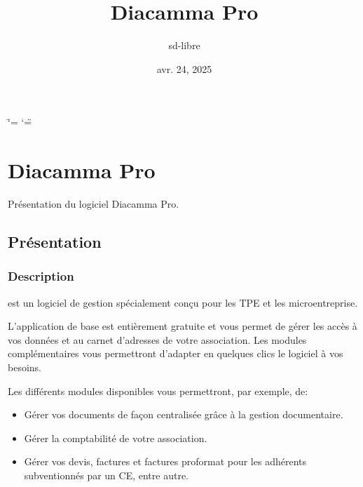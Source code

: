 \documentclass[a4paper,10pt,oneside,french]{sphinxmanual}
\title{Diacamma Pro}
\date{avr. 24, 2025}
\author{sd-libre}
\begin{document}
\ifdefined\shorthandoff
  \ifnum\catcode`\=\string=\active\shorthandoff{=}\fi
  \ifnum\catcode`\"=\active{}\fi
\fi

\pagestyle{empty}
\sphinxmaketitle
\pagestyle{plain}
\sphinxtableofcontents
\pagestyle{normal}
\label{\detokenize{index::doc}}


\sphinxstepscope


\chapter{Diacamma Pro}
\label{\detokenize{pro/index:diacamma-pro}}\label{\detokenize{pro/index::doc}}
\sphinxAtStartPar
Présentation du logiciel Diacamma Pro.

\sphinxstepscope


\section{Présentation}
\label{\detokenize{pro/presentation:presentation}}\label{\detokenize{pro/presentation::doc}}

\subsection{Description}
\label{\detokenize{pro/presentation:description}}
\sphinxAtStartPar
{} est un logiciel de gestion spécialement conçu pour les TPE et les micro\sphinxhyphen{}entreprise.

\sphinxAtStartPar
L’application de base est entièrement gratuite et vous permet de gérer les accès à vos données et au carnet d’adresses de votre association. Les modules complémentaires vous permettront d’adapter en quelques clics le logiciel à vos besoins.

\sphinxAtStartPar
Les différents modules disponibles vous permettront, par exemple, de:
\begin{itemize}
\item {} 
\sphinxAtStartPar
Gérer vos documents de façon centralisée grâce à la gestion documentaire.

\item {} 
\sphinxAtStartPar
Gérer la comptabilité de votre association.

\item {} 
\sphinxAtStartPar
Gérer vos devis, factures et factures proformat pour les adhérents subventionnés par un CE, entre autre.

\end{itemize}
\end{document}
